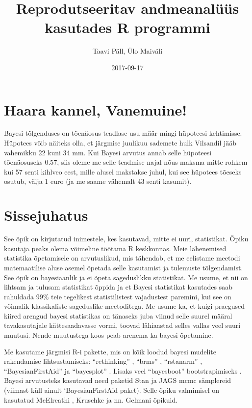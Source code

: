 \documentclass[]{book}
\title{Reprodutseeritav andmeanalüüs kasutades R programmi}
\author{Taavi Päll, Ülo Maiväli}
\date{2017-09-17}
\begin{document}
\maketitle

{
\setcounter{tocdepth}{1}
\tableofcontents
}
\chapter{Haara kannel, Vanemuine!}\label{haara-kannel-vanemuine}

Bayesi tõlgenduses on tõenäosus teadlase usu määr mingi hüpoteesi
kehtimisse. Hüpotees võib näiteks olla, et järgmise juulikuu sademete
hulk Vilsandil jääb vahemikku 22 kuni 34 mm. Kui Bayesi arvutus annab
selle hüpoteesi tõenäosuseks 0.57, siis oleme me selle teadmise najal
nõus maksma mitte rohkem kui 57 senti kihlveo eest, mille alusel
makstakse juhul, kui see hüpotees tõeseks osutub, välja 1 euro (ja me
saame vähemalt 43 senti kasumit).

\chapter{Sissejuhatus}\label{intro}

See õpik on kirjutatud inimestele, kes kasutavad, mitte ei uuri,
statistikat. Õpiku kasutaja peaks olema võimeline töötama R keskkonnas.
Meie lähenemised statistika õpetamisele on arvutuslikud, mis tähendab,
et me eelistame meetodi matemaatilise aluse asemel õpetada selle
kasutamist ja tulemuste tõlgendamist. See õpik on bayesiaanlik ja ei
õpeta sageduslikku statistikat. Me usume, et nii on lihtsam ja tulusam
statistikat õppida ja et Bayesi statistikat kasutades saab rahuldada
99\% teie tegelikest statistilistest vajadustest paremini, kui see on
võimalik klassikaliste sageduslike meetoditega. Me usume ka, et kuigi
praegused kiired arengud bayesi statistikas on tänaseks juba viinud
selle suurel määral tavakasutajale kättesaadavasse vormi, toovad
lähiaastad selles vallas veel suuri muutusi. Nende muutustega koos peab
arenema ka bayesi õpetamine.

Me kasutame järgmisi R-i pakette, mis on kõik loodud bayesi mudelite
rakendamise lihtsustamiseks: ``rethinking'' \citep{rethinking}, ``brms''
\citep{brms}, ``rstanarm'' \citep{rstanarm}, ``BayesianFirstAid''
\citep{bayesianfirstaid} ja ``bayesplot'' \citep{bayesplot}. Lisaks veel
``bayesboot'' bootstrapimiseks \citep{bayesboot}. Bayesi arvutusteks
kasutavad need paketid Stan ja JAGS mcmc sämplereid (viimast küll ainult
`BayesianFirstAid paket). Selle õpiku valmimisel on kasutatud McElreathi
\citep{mcelreath2015}, Kruschke \citep{kruschke2014} ja nn. Gelmani
\citep{gelman2014} õpikuid.
\end{document}
